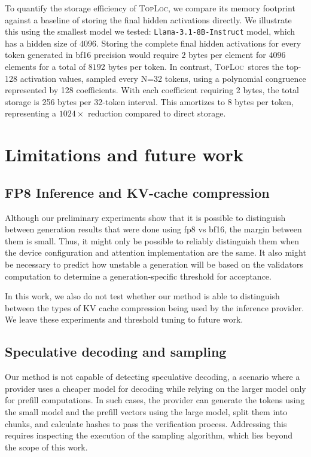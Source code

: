 \documentclass{article}
\theoremstyle{plain}
\theoremstyle{definition}
\theoremstyle{remark}
\newcommand{\toploc}{\textsc{TopLoc}}
\begin{document}
To quantify the storage efficiency of \toploc, we compare its memory footprint against a baseline of storing the final hidden activations directly.
We illustrate this using the smallest model we tested: \texttt{Llama-3.1-8B-Instruct} model, which has a hidden size of $4096$.
Storing the complete final hidden activations for every token generated in bf16 precision would require $2$ bytes per element for $4096$ elements for a total of $8192$ bytes per token.
In contrast, \toploc \ stores the top-128 activation values, sampled every N=32 tokens, using a polynomial congruence represented by 128 coefficients.
With each coefficient requiring 2 bytes, the total storage is 256 bytes per 32-token interval.
This amortizes to 8 bytes per token, representing a $1024\times$ reduction compared to direct storage.

\section{Limitations and future work}

\subsection{FP8 Inference and KV-cache compression}
Although our preliminary experiments show that it is possible to distinguish between generation results that were done using fp8 vs bf16, the margin between them is small.
Thus, it might only be possible to reliably distinguish them when the device configuration and attention implementation are the same.
It also might be necessary to predict how unstable a generation will be based on the validators computation to determine a generation-specific threshold for acceptance.

In this work, we also do not test whether our method is able to distinguish between the types of KV cache compression being used by the inference provider.
We leave these experiments and threshold tuning to future work.

\subsection{Speculative decoding and sampling}
Our method is not capable of detecting speculative decoding, a scenario where a provider uses a cheaper model for decoding while relying on the larger model only for prefill computations.
In such cases, the provider can generate the tokens using the small model and the prefill vectors using the large model, split them into chunks, and calculate hashes to pass the verification process.
Addressing this requires inspecting the execution of the sampling algorithm, which lies beyond the scope of this work.
\end{document}
